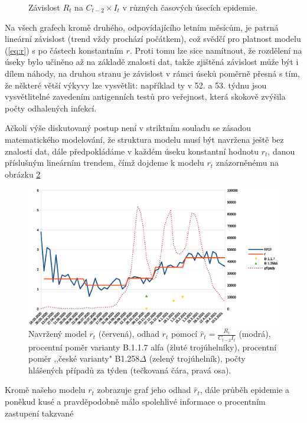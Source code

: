 \begin{figure}
\begin{center}
\caption{Závislost $R_t$ na $C_{t-2} \times I_t$ v různých časových úsecích epidemie.}
\label{fig:xy5}
\end{center}
\end{figure}
Na všech grafech kromě druhého, odpovídajícího letním měsícům, je patrná lineární závislost (trend
vždy prochází počátkem), což svědčí pro platnost
modelu (\ref{eq:r}) s po částech konstantním $r$. Proti tomu lze sice namítnout,
že rozdělení na úseky bylo učiněno až na základě znalosti dat, takže zjištěná závislost může být i dílem náhody, na druhou stranu je závislost v rámci úseků poměrně přesná s tím, že některé větší výkyvy lze vysvětlit: například ty v 52. a 53.
týdnu jsou vysvětlitelné zavedením antigenních testů pro veřejnost,
která skokově zvýšila počty odhalených infekcí. 

Ačkoli výše diskutovaný postup není v striktním souladu se zásadou matematického modelování, že struktura modelu musí být navržena ještě bez znalosti dat, dále předpokládáme v každém úseku konstantní hodnotu $r_{t}$,
danou příslušným lineárním trendem, čímž  dojdeme k modelu $r_{t}$ znázorněnému na obrázku \ref{fig:model}
\begin{figure}
\begin{center}
\includegraphics[scale=0.4]{pic/whole}
\caption{Navržený model $r_t$ (červená), odhad $r_t$ pomocí $\hat{r}_t = \frac{R_{t}}{C_{t-2}I_{t}}$ (modrá), procentní poměr varianty B.1.1.7 alfa (žluté trojúhelníky), procentní poměr ,,české varianty" B1.258$\Delta$ (zelený trojúhelník), počty hlášených případů za týden (tečkovaná čára, pravá osa).}
\label{fig:model}
\end{center}
\end{figure}
Kromě našeho modelu $r_t$ zobrazuje graf jeho odhad $\hat r_t$, dále průběh epidemie a poněkud kusé a pravděpodobně málo spolehlivé informace o procentním zastupení takzvané
